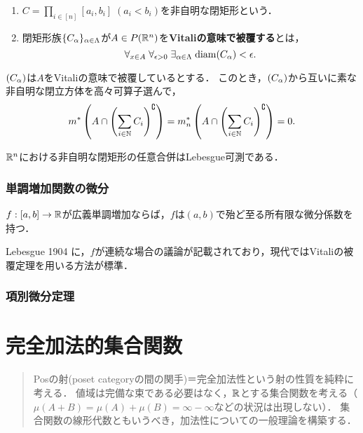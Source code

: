 \documentclass[uplatex, dvipdfmx]{jsreport}
\begin{document}
\begin{definition}\mbox{}
    \begin{enumerate}
        \item $C=\prod_{i\in[n]}[a_i,b_i]\;(a_i<b_i)$を非自明な閉矩形という．
        \item 閉矩形族$\{C_\alpha\}_{\alpha\in\Lambda}$が$A\in P(\mathbb{R}^n)$を\textbf{Vitaliの意味で被覆する}とは，
        \[\forall_{x\in A}\;\forall_{\epsilon>0}\;\exists_{\alpha\in\Lambda}\;\mathrm{diam}(C_\alpha)<\epsilon.\]
    \end{enumerate}
\end{definition}



\begin{theorem}[Vitali (1907)]
    $(C_\alpha)$は$A$をVitaliの意味で被覆しているとする．
    このとき，$(C_\alpha)$から互いに素な非自明な閉立方体を高々可算子選んで，
    \[m^*\left(A\cap\left(\sum_{i\in\mathbb{N}}C_i\right)^\complement\right)=m_n^*\left(A\cap\left(\sum_{i\in\mathbb{N}}C_i\right)^\complement\right)=0.\]
\end{theorem}

\begin{corollary}\label{cor-Vitali}
    $\mathbb{R}^n$における非自明な閉矩形の任意合併はLebesgue可測である．
\end{corollary}

\subsection{単調増加関数の微分}

\begin{theorem}[Lebesgue]
    $f:[a,b]\to\mathbb{R}$が広義単調増加ならば，$f$は$(a,b)$で殆ど至る所有限な微分係数を持つ．
\end{theorem}
\begin{history}
    Lebesgue 1904 \cite{Lebesgue04}に，$f$が連続な場合の議論が記載されており，現代ではVitaliの被覆定理を用いる方法が標準．
\end{history}

\subsection{項別微分定理}

\chapter{完全加法的集合関数}

\begin{quotation}
    Posの射(poset categoryの間の関手)＝完全加法性という射の性質を純粋に考える．
    値域は完備な束である必要はなく，$\mathbb{R}$とする集合関数を考える（$\mu(A+ B)=\mu(A)+\mu(B)=\infty-\infty$などの状況は出現しない）．
    集合関数の線形代数ともいうべき，加法性についての一般理論を構築する．
\end{quotation}
\end{document}
